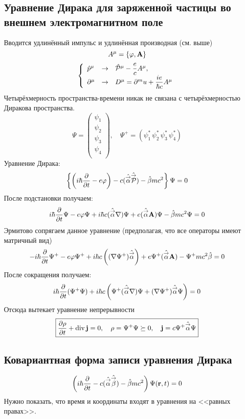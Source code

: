 \subsection{Уравнение Дирака для заряженной частицы во внешнем электромагнитном поле}
Вводится удлинённый импульс и удлинённая производная (см. выше)
$$
    A^{\mu} = \{\phi, \bf A\}
$$
$$
    \left\{
      \begin{array}{lcl}
        \hat p^\mu & \to & \hat \P^\mu - \dfrac{e}{c} A^\mu ,\\
        \pd^\mu & \to & D^\mu = \pd^mu + \dfrac{i e}{\hbar c} A^\mu
      \end{array}
    \right.
$$
Четырёхмерность пространства-времени никак не связана с четырёхмерностью Диракова пространства.
$$
    \Psi = \begin{pmatrix}
              \psi_1 \\
              \psi_2 \\
              \psi_3 \\
              \psi_4 \\
            \end{pmatrix}, \quad \Psi^+ = (\psi_1^\ast \, \psi_2^\ast \, \psi_3^\ast \, \psi_4^\ast)
$$
Уравнение Дирака:
$$
    \left\{
        \left(i \hbar \ud{}{t} - e \phi\right)
        - c (\hat{\vec \alpha} \hat{\vec \P})
        -\hat \beta m c^2
    \right\} \Psi = 0
$$
После подстановки получаем:
$$
    i \hbar \ud{}{t} \Psi - e \phi \Psi+ i \hbar c (\hat{\vec \alpha} \nla) \Psi + e (\hat{\vec \alpha} \bf A) \Psi - \hat \beta m c^2 \Psi = 0
$$
Эрмитово сопрягаем данное уравнение (предполагая, что все операторы имеют матричный вид)
$$
    -i \hbar \ud{}{t} \Psi^{+} - e \phi \Psi^{+} + i \hbar c \left( (\nla \Psi^+) \hat{\vec \alpha} \right) + e \Psi^+ (\hat{\vec\alpha} \bf A) - \Psi^{+} mc^2 \hat \beta = 0
$$
После сокращения получаем:
$$
    i \hbar \ud{}{t} (\Psi^+ \Psi) + i \hbar c \left(
        \Psi^+ (\hat{\vec \alpha} \nla) \Psi + (\nla \Psi^+) \hat{\vec \alpha} \Psi
    \right) = 0
$$
Отсюда вытекает уравнение непрерывности
$$
\boxed{
    \ud{\rho}{t} + \div \bf j = 0, \quad \rho = \Psi^+ \Psi \succeq 0, \quad \bf j = c \Psi^+ \hat{\vec \alpha} \Psi
}
$$
\subsection{Ковариантная форма записи уравнения Дирака}
$$
    \left(
        i \hbar \ud{}{t} - c(\hat{\vec \alpha} \hat{\vec \beta}) - \hat \beta mc^2
    \right) \Psi(\bf r, t) = 0
$$
Нужно показать, что время и координаты входят в уравнения на <<равных правах>>.

